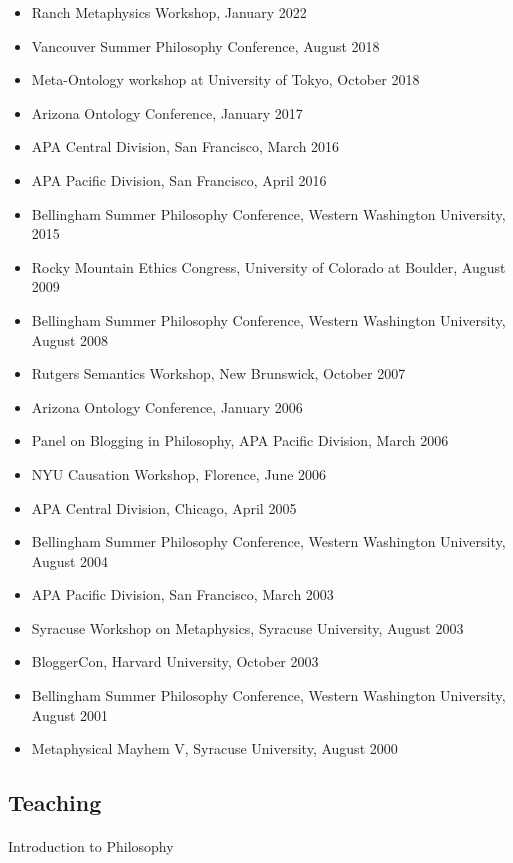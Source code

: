 \documentclass[
  10pt,
  letterpaper,
  DIV=11,
  numbers=noendperiod,
  twoside]{scrartcl}
\makeatletter
\let\oldparagraph\paragraph
\renewcommand{\paragraph}{
    \@ifstar
      \xxxParagraphStar
      \xxxParagraphNoStar
  }
\newcommand{\xxxParagraphStar}[1]{\oldparagraph*{#1}\mbox{}}
\newcommand{\xxxParagraphNoStar}[1]{\oldparagraph{#1}\mbox{}}
\providecommand{\tightlist}{%
  \setlength{\itemsep}{0pt}\setlength{\parskip}{0pt}}\usepackage{longtable,booktabs,array}
\makeatother
\begin{document}
\begin{itemize}
\tightlist
\item
  Ranch Metaphysics Workshop, January 2022
\item
  Vancouver Summer Philosophy Conference, August 2018
\item
  Meta-Ontology workshop at University of Tokyo, October 2018
\item
  Arizona Ontology Conference, January 2017
\item
  APA Central Division, San Francisco, March 2016
\item
  APA Pacific Division, San Francisco, April 2016
\item
  Bellingham Summer Philosophy Conference, Western Washington
  University, 2015
\item
  Rocky Mountain Ethics Congress, University of Colorado at Boulder,
  August 2009
\item
  Bellingham Summer Philosophy Conference, Western Washington
  University, August 2008
\item
  Rutgers Semantics Workshop, New Brunswick, October 2007
\item
  Arizona Ontology Conference, January 2006
\item
  Panel on Blogging in Philosophy, APA Pacific Division, March 2006
\item
  NYU Causation Workshop, Florence, June 2006
\item
  APA Central Division, Chicago, April 2005
\item
  Bellingham Summer Philosophy Conference, Western Washington
  University, August 2004
\item
  APA Pacific Division, San Francisco, March 2003
\item
  Syracuse Workshop on Metaphysics, Syracuse University, August 2003
\item
  BloggerCon, Harvard University, October 2003
\item
  Bellingham Summer Philosophy Conference, Western Washington
  University, August 2001
\item
  Metaphysical Mayhem V, Syracuse University, August 2000
\end{itemize}

\subsection{Teaching}\label{teaching}

\paragraph{Introduction to Philosophy}\label{introduction-to-philosophy}
\end{document}
